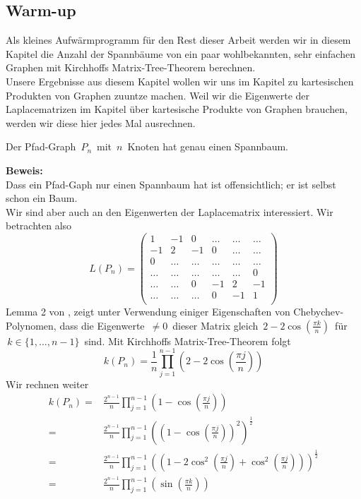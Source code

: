 \subsection{Warm-up}
Als kleines Aufwärmprogramm für den Rest dieser Arbeit werden wir in diesem Kapitel die Anzahl der Spannbäume von ein paar wohlbekannten, sehr einfachen Graphen mit Kirchhoffs Matrix-Tree-Theorem berechnen.\\
Unsere Ergebnisse aus diesem Kapitel wollen wir uns im Kapitel zu kartesischen Produkten von Graphen zuuntze machen. Weil wir die Eigenwerte der Laplacematrizen im Kapitel über kartesische Produkte von Graphen brauchen, werden wir diese hier jedes Mal ausrechnen.\\
\begin{Lms}
 Der Pfad-Graph $\,P_n\,$ mit $\,n\,$ Knoten hat genau einen Spannbaum.
\end{Lms}
\textbf{Beweis:}\\
Dass ein Pfad-Gaph nur einen Spannbaum hat ist offensichtlich; er ist selbst schon ein Baum.\\
Wir sind aber auch an den Eigenwerten der Laplacematrix interessiert. Wir betrachten also\\
\begin{equation*}
L(P_n)=
\begin{pmatrix}
1&-1&0&\ldots&\ldots&\ldots\\
-1&2&-1&0&\ldots&\ldots\\
0&\ldots&\ldots&\ldots&\ldots&\ldots\\
\ldots&\ldots&\ldots&\ldots&\ldots&0\\
\ldots&\ldots&0&-1&2&-1\\
\ldots&\ldots&\ldots&0&-1&1\\
\end{pmatrix}
\end{equation*}
Lemma 2 von \cite{daoud_2014}, zeigt unter Verwendung einiger Eigenschaften von Chebychev-Polynomen, dass die Eigenwerte $\,\neq 0\,$ dieser Matrix gleich $\,2-2\cos \left(\frac{\pi k}{n}\right)\,$ für $\,k \in \{1,\ldots,n-1\}\,$ sind.
Mit Kirchhoffs Matrix-Tree-Theorem folgt
\begin{equation*}
 \mathit{k}(P_n)=\frac{1}{n}\prod_{j=1}^{n-1} \left(2-2\cos \left(\frac{\pi j}{n}\right)\right)
\end{equation*}
Wir rechnen weiter
\begin{equation*}
\begin{split}
 \mathit{k}(P_n)={} & \frac{2^{n-1}}{n}\prod_{j=1}^{n-1} \left(1-\cos \left(\frac{\pi j}{n}\right)\right) \\
  ={}& \frac{2^{n-1}}{n}\prod_{j=1}^{n-1} \left(\left(1-\cos \left(\frac{\pi j}{n}\right)\right)^2\right)^{\frac{1}{2}} \\
  ={}&\frac{2^{n-1}}{n}\prod_{j=1}^{n-1} \left(\left(1-2\cos^2 \left(\frac{\pi j}{n}\right)+\cos^2 \left(\frac{\pi j}{n}\right)\right)\right)^{\frac{1}{2}} \\
  ={}& \frac{2^{n-1}}{n}\prod_{j=1}^{n-1} \left(\sin\left(\frac{\pi k}{n}\right) \right)
  \end{split}
\end{equation*}
